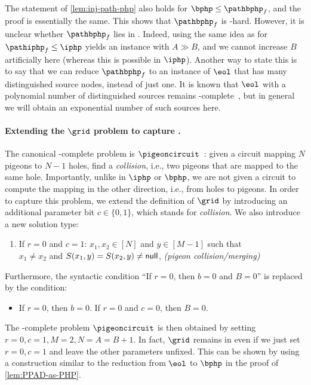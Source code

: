 \documentclass[10pt,a4paper]{article}
\theoremstyle{definition}
\theoremstyle{plain}
\theoremstyle{remark}
\newcommand{\nul}{\textup{\textsf{null}}}
\begin{document}
The statement of \cref{lem:inj-path-php} also holds for $\bphp\leq \pathbphp_f$, and the proof is essentially the same. This shows that $\pathbphp_f$ is \PPAD-hard. However, it is unclear whether $\pathbphp_f$ lies in \PPAD. Indeed, using the same idea as for $\pathiphp_f \leq \iphp$ yields an instance with $A \gg B$, and we cannot increase $B$ artificially here (whereas this is possible in $\iphp$). Another way to state this is to say that we can reduce $\pathbphp_f$ to an instance of $\eol$ that has many distinguished source nodes, instead of just one. It is known that $\eol$ with a polynomial number of distinguished sources remains \PPAD-complete~\cite{Goldberg2021}, but in general we will obtain an exponential number of such sources here.



\paragraph{Extending the $\grid$ problem to capture \PPP.}
The canonical \PPP-complete problem is $\pigeoncircuit$~\cite{Papadimitriou1994}: given a circuit mapping $N$ pigeons to $N-1$ holes, find a \emph{collision}, i.e., two pigeons that are mapped to the same hole. Importantly, unlike in $\iphp$ or $\bphp$, we are not given a circuit to compute the mapping in the other direction, i.e., from holes to pigeons. In order to capture this problem, we extend the definition of $\grid$ by introducing an additional parameter bit $c \in \{0,1\}$, which stands for \emph{collision}. We also introduce a new solution type:
\begin{enumerate}
    \item[5.] If $r=0$ and $c=1$: $x_1,x_2 \in [N]$ and $y \in [M-1]$ such that \\
    $x_1 \neq x_2$ and $S(x_1,y) = S(x_2,y) \neq \nul$, \hfill \emph{(pigeon collision/merging)}
\end{enumerate}
Furthermore, the syntactic condition ``If $r=0$, then $b=0$ and $B=0$'' is replaced by the condition:
\begin{itemize}
    \item If $r=0$, then $b=0$. If $r=0$ and $c=0$, then $B=0$.
\end{itemize}
The \PPP-complete problem $\pigeoncircuit$ is then obtained by setting $r=0, c=1, M=2, N=A=B+1$. In fact, $\grid$ remains in \PPP even if we just set $r=0, c=1$ and leave the other parameters unfixed. This can be shown by using a construction similar to the reduction from $\eol$ to $\bphp$ in the proof of \cref{lem:PPAD-as-PHP}.
\end{document}
